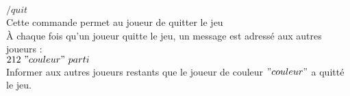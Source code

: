 
\par
$/quit$\\
Cette commande permet au joueur de quitter le jeu\\

À chaque fois qu'un joueur quitte le jeu, un message est adressé aux autres joueurs : \\

$212 ~ "couleur" ~ parti$ \\
Informer aux autres joueurs restants que le joueur de couleur $"couleur"$ a quitté le jeu.
\\